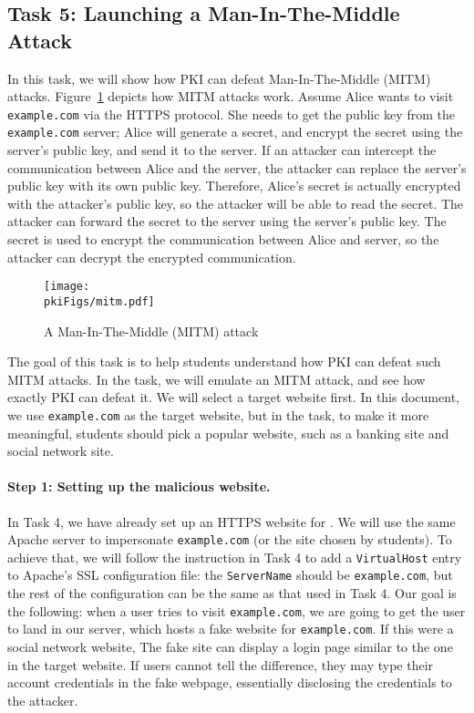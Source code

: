 \subsection{Task 5: Launching a Man-In-The-Middle Attack}

In this task, we will show how PKI can defeat Man-In-The-Middle (MITM) attacks. 
Figure~\ref{pki:fig:mitm} depicts how MITM attacks work. 
Assume Alice wants to visit \texttt{example.com} via the HTTPS protocol. She 
needs to get the public key from the \texttt{example.com} server; Alice will 
generate a secret, and encrypt the secret using the server's public key,
and send it to the server. 
If an attacker can
intercept the communication between Alice and the server, the attacker 
can replace the server's public key with its own public key. Therefore, Alice's secret is
actually encrypted with the attacker's public key, so the attacker
will be able to read the secret. The attacker can forward the secret to the server using the
server's public key. The secret is used to encrypt the communication between Alice and server,  
so the attacker can decrypt the encrypted communication. 


\begin{figure}[htb]
   \begin{center}
      \texttt{[image: \\pkiFigs/mitm.pdf]}
   \end{center}
   \caption{A Man-In-The-Middle (MITM) attack}
   \label{pki:fig:mitm}
\end{figure}



The goal of this task is to help students understand how PKI can defeat such MITM attacks. 
In the task, we will emulate an MITM attack, and see how exactly PKI can defeat it.
We will select a target website first. In this document, we use 
\texttt{example.com} as the target website, but in the task, to make it more meaningful,
students should pick a popular website, such as a banking site and social network site. 


\paragraph{Step 1: Setting up the malicious website.} 
In Task 4, we have already set up an HTTPS website for \pkiserver. We will
use the same Apache server to impersonate \texttt{example.com} (or the site chosen by students).  
To achieve that, we will follow the instruction in Task 4 to 
add a \texttt{VirtualHost} entry to Apache's SSL configuration file: the
\texttt{ServerName} should be \texttt{example.com}, but the rest of the
configuration can be the same as that used in Task 4.
Our goal is the following: when a user tries to visit \texttt{example.com}, 
we are going to get the user to land in our server, which hosts 
a fake website for \texttt{example.com}. If this were a social network
website, The fake site can display a login page similar to the
one in the target website. If users cannot tell the difference, they may type their account credentials
in the fake webpage, essentially disclosing the credentials to the attacker. 


